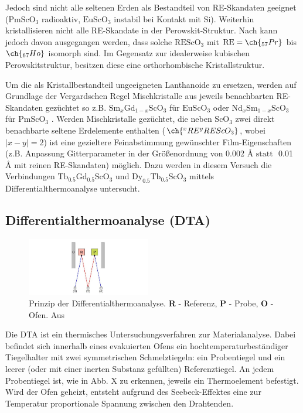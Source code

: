 \documentclass[aps,twocolumn,secnumarabic,nobalancelastpage,amsmath,amssymb,
nofootinbib,superscriptaddress]{revtex4-1}
\begin{document}
Jedoch sind nicht alle seltenen Erden als Bestandteil von RE-Skandaten geeignet ($\text{PmScO}_3$ radioaktiv, $\text{EuScO}_3$ instabil bei Kontakt mit Si).
Weiterhin kristallisieren nicht alle RE-Skandate in der Perowskit-Struktur. Nach \cite{perowskHoPr} kann jedoch davon ausgegangen werden, dass solche $\text{REScO}_3$ mit
$\text{RE}=\ch{_{57}Pr}$ bis $\ch{_{67}Ho}$ isomorph sind. Im Gegensatz zur idealerweise kubischen Perowskitstruktur, besitzen diese eine orthorhombische Kristallstruktur.

Um die als Kristallbestandteil ungeeigneten Lanthanoide zu ersetzen, werden auf Grundlage der Vergardschen Regel Mischkristalle aus jeweils benachbarten RE-Skandaten gezüchtet so z.B.
$\text{Sm}_x\text{Gd}_{1-x}\text{ScO}_3$ für $\text{EuScO}_3$ oder $\text{Nd}_x\text{Sm}_{1-x}\text{ScO}_3$ für $\text{PmScO}_3$ \cite{paperK}. Werden Mischkristalle gezüchtet,
die neben $\text{ScO}_3$ zwei direkt benachbarte seltene Erdelemente enthalten ($\ch{^{x}RE^{y}REScO_3}$, wobei $|x-y|=2$) ist eine gezieltere Feinabstimmung gewünschter
Film-Eigenschaften (z.B. Anpassung Gitterparameter in der Größenordnung von 0.002 \AA$\text{ statt }$ 0.01 \AA$\text{ mit}$ reinen RE-Skandaten) möglich. Dazu werden in diesem Versuch
die Verbindungen $\text{Tb}_{0.5}\text{Gd}_{0.5}\text{ScO}_3$ und $\text{Dy}_{0.5}\text{Tb}_{0.5}\text{ScO}_3$ mittels Differentialthermoanalyse untersucht.

\subsection{Differentialthermoanalyse (DTA)}
\begin{figure}[h]
  \centering
  \includegraphics[width=0.48\textwidth]{../img/exp.jpg}
  \caption{\label{fig:exp} Prinzip der Differentialthermoanalyse. \textbf{R} - Referenz, \textbf{P} - Probe, \textbf{O} - Ofen. Aus \cite{versuchsbeschr}}
\end{figure}

\noindent Die DTA ist ein thermisches Untersuchungsverfahren zur Materialanalyse. Dabei befindet sich innerhalb eines evakuierten Ofens ein hochtemperaturbeständiger Tiegelhalter
mit zwei symmetrischen Schmelztiegeln: ein Probentiegel und ein leerer (oder mit einer inerten Substanz gefüllten) Referenztiegel. An jedem Probentiegel ist,
wie in Abb. X zu erkennen, jeweils ein Thermoelement befestigt. Wird der Ofen geheizt, entsteht aufgrund des Seebeck-Effektes eine zur Temperatur proportionale Spannung zwischen den Drahtenden.
\end{document}
